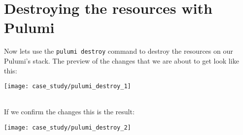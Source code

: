 \section{Destroying the resources with Pulumi}
Now lets use the \texttt{pulumi destroy} command to destroy the resources on our Pulumi's stack.
The preview of the changes that we are about to get look like this:
\begin{center}
  \texttt{[image: case\_study/pulumi\_destroy\_1]} 
\end{center}\mbox{}\\

If we confirm the changes this is the result:
\begin{center}
  \texttt{[image: case\_study/pulumi\_destroy\_2]} 
\end{center}\mbox{}\\


